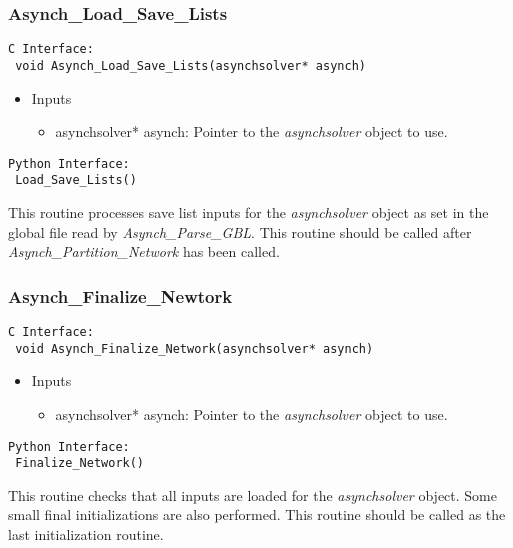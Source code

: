 \documentclass[12pt]{article}
\begin{document}
\subsubsection{Asynch\_Load\_Save\_Lists} \label{sec: asynch_load_save_lists}

\begin{lstlisting}[style=CStyle]
 C Interface:
 void Asynch_Load_Save_Lists(asynchsolver* asynch)
\end{lstlisting}
\begin{itemize}
 \item Inputs
  \begin{itemize}
   \item asynchsolver* asynch: Pointer to the \emph{asynchsolver} object to use.
  \end{itemize}
\end{itemize}
\begin{lstlisting}[style=PythonStyle]
 Python Interface:
 Load_Save_Lists()
\end{lstlisting}
This routine processes save list inputs for the \emph{asynchsolver} object as set in the global file read by \emph{Asynch\_Parse\_GBL}. This routine should be called after \emph{Asynch\_Partition\_Network} has been called.


\subsubsection{Asynch\_Finalize\_Newtork} \label{sec: asynch_finalize_network}

\begin{lstlisting}[style=CStyle]
 C Interface:
 void Asynch_Finalize_Network(asynchsolver* asynch)
\end{lstlisting}
\begin{itemize}
 \item Inputs
  \begin{itemize}
   \item asynchsolver* asynch: Pointer to the \emph{asynchsolver} object to use.
  \end{itemize}
\end{itemize}
\begin{lstlisting}[style=PythonStyle]
 Python Interface:
 Finalize_Network()
\end{lstlisting}
This routine checks that all inputs are loaded for the \emph{asynchsolver} object. Some small final initializations are also performed. This routine should be called as the last initialization routine.
\end{document}

